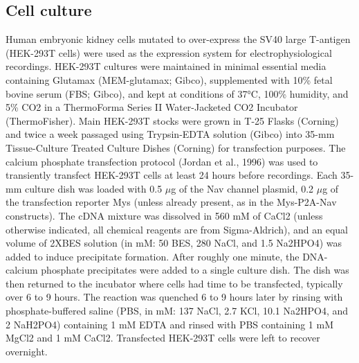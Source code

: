 \subsection{Cell culture}
Human embryonic kidney cells mutated to over-express the SV40 large T-antigen (HEK-293T cells) were used as the expression system for electrophysiological recordings. HEK-293T cultures were maintained in minimal essential media containing Glutamax (MEM-glutamax; Gibco), supplemented with 10\% fetal bovine serum (FBS; Gibco), and kept at conditions of 37°C, 100\% humidity, and 5\% CO2 in a ThermoForma Series II Water-Jacketed CO2 Incubator (ThermoFisher). Main HEK-293T stocks were grown in T-25 Flasks (Corning) and twice a week passaged using Trypsin-EDTA solution (Gibco) into 35-mm Tissue-Culture Treated Culture Dishes (Corning) for transfection purposes. The calcium phosphate transfection protocol (Jordan et al., 1996) was used to transiently transfect HEK-293T cells at least 24 hours before recordings. Each 35-mm culture dish was loaded with 0.5 $\mu$g of the Nav channel plasmid, 0.2 $\mu$g of the transfection reporter Mys (unless already present, as in the Mys-P2A-Nav constructs). The cDNA mixture was dissolved in 560 mM of CaCl2 (unless otherwise indicated, all chemical reagents are from Sigma-Aldrich), and an equal volume of 2XBES solution (in mM: 50 BES, 280 NaCl, and 1.5 Na2HPO4) was added to induce precipitate formation. After roughly one minute, the DNA-calcium phosphate precipitates were added to a single culture dish. The dish was then returned to the incubator where cells had time to be transfected, typically over 6 to 9 hours. The reaction was quenched 6 to 9 hours later by rinsing with phosphate-buffered saline (PBS, in mM: 137 NaCl, 2.7 KCl, 10.1 Na2HPO4, and 2 NaH2PO4) containing 1 mM EDTA and rinsed with PBS containing 1 mM MgCl2 and 1 mM CaCl2. Transfected HEK-293T cells were left to recover overnight.

